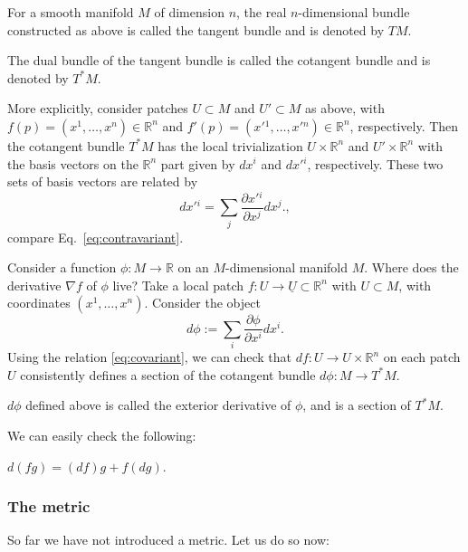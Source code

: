 \documentclass[12pt]{article}
\numberwithin{equation}{section}
\numberwithin{figure}{section}
\theoremstyle{remark}
\def\bR{\mathbb{R}}
\begin{document}
\begin{definition}
For a smooth manifold $M$ of dimension $n$,
the real $n$-dimensional bundle constructed as above is called the tangent bundle and is denoted by $TM$.
\end{definition}

\begin{definition}
The dual bundle of the tangent bundle is called the cotangent bundle and is denoted by $T^*M$.
\end{definition}
More explicitly, consider patches $U\subset M$
and $U'\subset M$ as above,
with $f(p)=(x^1,\ldots,x^n)\in \bR^n$
and $f'(p)=(x'{}^1,\ldots,x'{}^n)\in \bR^n$, respectively.
Then the cotangent bundle $T^*M$ has the local trivialization
$U\times \bR^n$  and $U'\times \bR^n$
with the basis vectors on the $\bR^n$ part
given by $dx^i$ and $dx'{}^i$, respectively.
These two sets of basis vectors are related by 
\begin{equation}
  dx'{}^i = \sum_j \frac{\partial x'{}^i}{\partial x^j} dx^j.
  \label{eq:covariant},
\end{equation}
compare Eq.~\ref{eq:contravariant}.


Consider a function $\phi:M \to \bR$ on an $M$-dimensional manifold $M$.
Where does the derivative $\nabla f$ of $\phi$ live?
Take a local patch $f:U\to \underline{U}\subset \bR^n$ with $U\subset M$,
with coordinates $(x^1,\ldots,x^n)$.
Consider the object \begin{equation}
d\phi := \sum_i \frac{\partial \phi}{\partial x^i} dx^i.
\end{equation}
Using the relation \eqref{eq:covariant},
we can check that $df: U\to U\times \bR^n$ 
on each patch $U$ consistently defines a section of the cotangent bundle 
$d\phi: M\to T^*M$.
\begin{definition}
  \label{def:exterior-derivative}
  $d\phi$ defined above is called the exterior derivative of $\phi$,
  and is a section of $T^*M$.
\end{definition}

We can easily check the following: \begin{proposition}
$d(fg)=(df)g+ f(dg)$.
\end{proposition}

\subsubsection{The metric}

So far we have not introduced a metric. Let us do so now:
\end{document}
